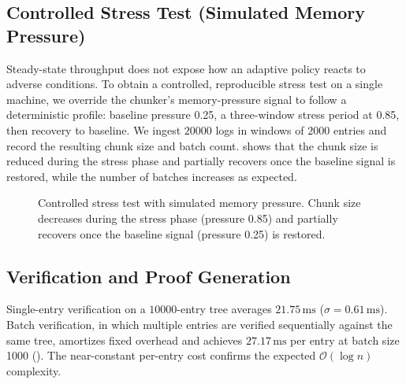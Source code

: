 \documentclass[preprint,12pt]{elsarticle}
\begin{document}
\subsection{Controlled Stress Test (Simulated Memory Pressure)}
\label{sec:stress}

Steady-state throughput does not expose how an adaptive policy reacts to adverse conditions.
To obtain a controlled, reproducible stress test on a single machine, we override the chunker's memory-pressure signal to follow a deterministic profile: baseline pressure 0.25, a three-window stress period at 0.85, then recovery to baseline.
We ingest $20000$ logs in windows of $2000$ entries and record the resulting chunk size and batch count.
 shows that the chunk size is reduced during the stress phase and partially recovers once the baseline signal is restored, while the number of batches increases as expected.

\begin{figure}[t]
\centering
{}
\caption{Controlled stress test with simulated memory pressure. Chunk size decreases during the stress phase (pressure 0.85) and partially recovers once the baseline signal (pressure 0.25) is restored.}
\label{fig:controlled_stress}
\end{figure}

\subsection{Verification and Proof Generation}
\label{sec:verif_results}

Single-entry verification on a $10000$-entry tree averages $21.75\,\mathrm{ms}$ ($\sigma = 0.61\,\mathrm{ms}$).
Batch verification, in which multiple entries are verified sequentially against the same tree, amortizes fixed overhead and achieves $27.17\,\mathrm{ms}$ per entry at batch size 1000 ().
The near-constant per-entry cost confirms the expected $\mathcal{O}(\log n)$ complexity.
\end{document}
